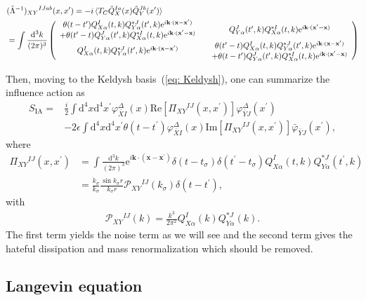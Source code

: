 \documentclass[a4paper,11pt]{article}
\newcommand{\dd}{\mathrm{d}}
\newcommand{\ee}{\mathrm{e}}
\renewcommand{\Re}{\mathrm{Re}}
\renewcommand{\Im}{\mathrm{Im}}
\newcommand{\dk}{\frac{\dd^3k}{(2\pi)^3}}
\newcommand{\SIA}{S_\text{IA}}
\newcommand{\calP}{\mathcal{P}}
\newcommand{\bae}[1]{\begin{align} #1 \end{align}}
\newcommand{\bpme}[1]{\begin{pmatrix} #1 \end{pmatrix}}
\begin{document}
\bae{
	&(\tilde{\Lambda}^{-1})_{XY}{}^{IJab}(x,x^\prime)=-i\braket{T_C\hat{Q}_X^{Ia}(x)\hat{Q}_Y^{Jb}(x^\prime)} \nonumber \\
	&=\int\dk\bpme{
		\begin{array}{c}
			\theta(t-t^\prime)Q_{X\alpha}^I(t,k)Q^{*J}_{Y\alpha}(t^\prime,k)\ee^{i\mathbf{k}\cdot(\mathbf{x}-\mathbf{x}^\prime)} \\
			+\theta(t^\prime-t)Q_{Y\alpha}^J(t^\prime,k)Q_{X\alpha}^{*I}(t,k)\ee^{i\mathbf{k}\cdot(\mathbf{x}^\prime-\mathbf{x})}
		\end{array}
		& Q^J_{Y\alpha}(t^\prime,k)Q_{X\alpha}^{*I}(t,k)\ee^{i\mathbf{k}\cdot(\mathbf{x}^\prime-\mathbf{x})} \\
		Q_{X\alpha}^I(t,k)Q^{*J}_{Y\alpha}(t^\prime,k)\ee^{i\mathbf{k}\cdot(\mathbf{x}-\mathbf{x}^\prime)} &
		\begin{array}{c}
			\theta(t^\prime-t)Q_{X\alpha}^I(t,k)Q^{*J}_{Y\alpha}(t^\prime,k)\ee^{i\mathbf{k}\cdot(\mathbf{x}-\mathbf{x}^\prime)} \\
			+\theta(t-t^\prime)Q^J_{Y\alpha}(t^\prime,k)Q_{X\alpha}^{*I}(t,k)\ee^{i\mathbf{k}\cdot(\mathbf{x}^\prime-\mathbf{x})}
		\end{array}
	}
}

Then, moving to the Keldysh basis~(\ref{eq: Keldysh}), one can summarize the influence action as
\bae{\label{eq: SIA}
	\SIA=&\frac{i}{2}\int\dd^4x\dd^4x^\prime\varphi_{\bar{X}I}^\Delta(x)\Re[\Pi_{XY}{}^{IJ}(x,x^\prime)]\varphi_{\bar{Y}J}^{\Delta}(x^\prime) \nonumber \\
	&-2\epsilon\int\dd^4x\dd^4x^\prime\theta(t-t^\prime)\varphi_{\bar{X}I}^\Delta(x)\Im[\Pi_{XY}{}^{IJ}(x,x^\prime)]\bar{\varphi}_{\bar{Y}J}(x^\prime),
}
where
\bae{
	\Pi_{XY}{}^{IJ}(x,x^\prime)&=\int\dk\ee^{i\mathbf{k}\cdot(\mathbf{x}-\mathbf{x}^\prime)}\delta(t-t_\sigma)\delta(t^\prime-t_\sigma)
	Q_{X\alpha}^I(t,k)Q^{*J}_{Y\alpha}(t^\prime,k) \nonumber \\
	&=\frac{\dot{k}_\sigma}{k_\sigma}\frac{\sin k_\sigma r}{k_\sigma r}\calP_{XY}{}^{IJ}(k_\sigma)\delta(t-t^\prime),
}
with
\bae{\label{eq: calP}
	\calP_{XY}{}^{IJ}(k)=\frac{k^3}{2\pi^2}Q_{X\alpha}^I(k)Q_{Y\alpha}^{*J}(k).
}
The first term yields the noise term as we will see and the second term gives the hateful dissipation and mass renormalization which should be
removed.


\subsection{Langevin equation}
\end{document}
